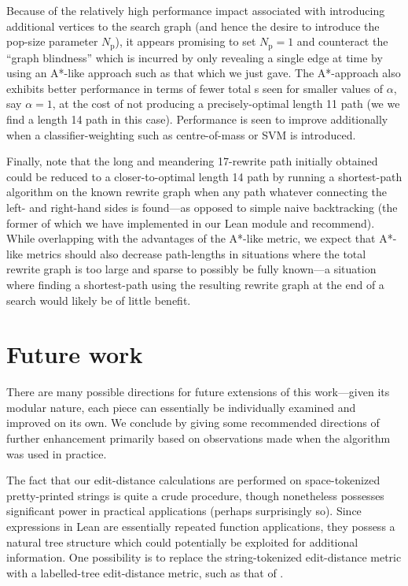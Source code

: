 \documentclass[12pt]{article}
\begin{document}
Because of the relatively high performance impact associated with introducing additional \expr{} vertices to the search graph (and hence the desire to introduce the pop-size parameter $N_\text{p}$), it appears promising to set $N_\text{p} = 1$ and counteract the ``graph blindness'' which is incurred by only revealing a single edge at time by using an A*-like approach such as that which we just gave. The A*-approach also exhibits better performance in terms of fewer total \expr{}s seen for smaller values of $\alpha$, say $\alpha = 1$, at the cost of not producing a precisely-optimal length 11 path (we we find a length 14 path in this case). Performance is seen to improve additionally when a classifier-weighting such as centre-of-mass or SVM is introduced.

Finally, note that the long and meandering 17-rewrite path initially obtained could be reduced to a closer-to-optimal length 14 path by running a shortest-path algorithm on the known rewrite graph when any path whatever connecting the left- and right-hand sides is found---as opposed to simple naive backtracking (the former of which we have implemented in our Lean module and recommend). While overlapping with the advantages of the A*-like metric, we expect that A*-like metrics should also decrease path-lengths in situations where the total rewrite graph is too large and sparse to possibly be fully known---a situation where finding a shortest-path using the resulting rewrite graph at the end of a search would likely be of little benefit.

\section{Future work}

There are many possible directions for future extensions of this work---given its modular nature, each piece can essentially be individually examined and improved on its own. We conclude by giving some recommended directions of further enhancement primarily based on observations made when the algorithm was used in practice.

The fact that our edit-distance calculations are performed on space-tokenized pretty-printed strings is quite a crude procedure, though nonetheless possesses significant power in practical applications (perhaps surprisingly so). Since expressions in Lean are essentially repeated function applications, they possess a natural tree structure which could potentially be exploited for additional information. One possibility is to replace the string-tokenized edit-distance metric with a labelled-tree edit-distance metric, such as that of \cite{pawlik2011rted}.
\end{document}
